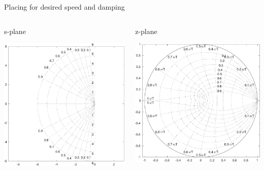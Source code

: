 \documentclass[presentation,aspectratio=1610]{beamer}
\begin{document}
\begin{frame}[label={sec:org77b05b0}]{Placing for desired speed and damping}
\begin{columns}
\begin{column}{0.4\columnwidth}
\alert{s-plane}

\begin{center}
 \includegraphics[height=.6\textheight]{../../figures/sgrid-crop}
\end{center}
\end{column}
\begin{column}{0.6\columnwidth}
\alert{z-plane}
\begin{center}
 \includegraphics[height=.59\textheight]{../../figures/zgrid-crop}
\end{center}
\end{column}
\end{columns}
\end{frame}
\end{document}
